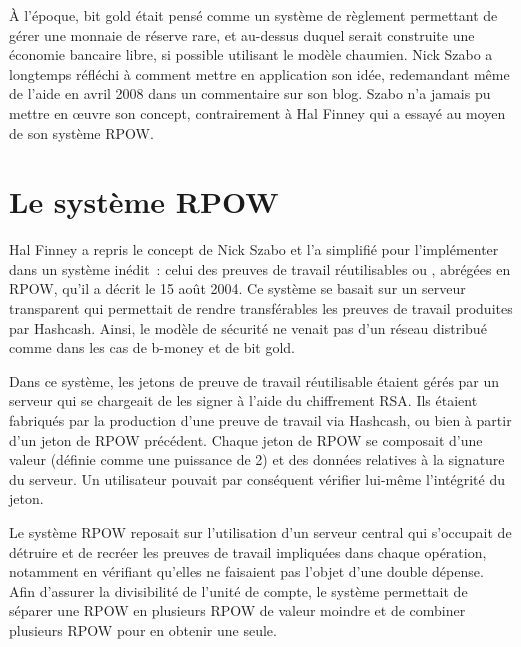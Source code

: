 À l'époque, bit gold était pensé comme un système de règlement permettant de gérer une monnaie de réserve rare, et au-dessus duquel serait construite une économie bancaire libre, si possible utilisant le modèle chaumien. Nick Szabo a longtemps réfléchi à comment mettre en application son idée, redemandant même de l'aide en avril 2008 dans un commentaire sur son blog. Szabo n'a jamais pu mettre en œuvre son concept, contrairement à Hal Finney qui a essayé au moyen de son système RPOW.

\section*{Le système RPOW} %

Hal Finney a repris le concept de Nick Szabo et l'a simplifié pour l'implémenter dans un système inédit~: celui des preuves de travail réutilisables ou , abrégées en RPOW, qu'il a décrit le 15 août 2004. Ce système se basait sur un serveur transparent qui permettait de rendre transférables les preuves de travail produites par Hashcash. Ainsi, le modèle de sécurité ne venait pas d'un réseau distribué comme dans les cas de b-money et de bit gold.

Dans ce système, les jetons de preuve de travail réutilisable étaient gérés par un serveur qui se chargeait de les signer à l'aide du chiffrement RSA. Ils étaient fabriqués par la production d'une preuve de travail via Hashcash, ou bien à partir d'un jeton de RPOW précédent. Chaque jeton de RPOW se composait d'une valeur (définie comme une puissance de 2) et des données relatives à la signature du serveur. Un utilisateur pouvait par conséquent vérifier lui-même l'intégrité du jeton.

Le système RPOW reposait sur l'utilisation d'un serveur central qui s'occupait de détruire et de recréer les preuves de travail impliquées dans chaque opération, notamment en vérifiant qu'elles ne faisaient pas l'objet d'une double dépense. Afin d'assurer la divisibilité de l'unité de compte, le système permettait de séparer une RPOW en plusieurs RPOW de valeur moindre et de combiner plusieurs RPOW pour en obtenir une seule.

